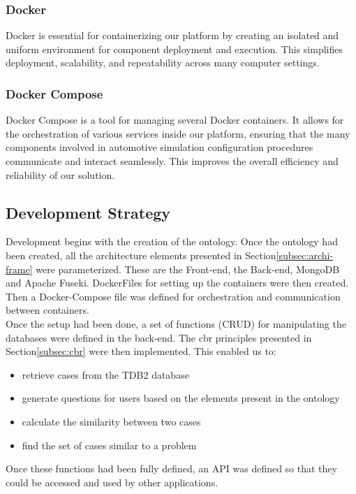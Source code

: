     \subsubsection{Docker}
    Docker is essential for containerizing our platform by creating an isolated and uniform environment for component deployment and execution. This simplifies deployment, scalability, and repeatability across many computer settings.
    
    \subsubsection{Docker Compose}
    Docker Compose is a tool for managing several Docker containers. It allows for the orchestration of various services inside our platform, ensuring that the many components involved in automotive simulation configuration procedures communicate and interact seamlessly. This improves the overall efficiency and reliability of our solution.

    
\subsection{Development Strategy}
Development begins with the creation of the ontology. Once the ontology had been created, all the architecture elements presented in Section\ref{subsec:archi-frame} were parameterized. These are the Front-end, the Back-end, MongoDB and Apache Fuseki. DockerFiles for setting up the containers were then created. Then a Docker-Compose file was defined for orchestration and communication between containers.\\

Once the setup had been done, a set of functions (CRUD) for manipulating the databases were defined in the back-end. The \acrshort{cbr} principles presented in Section\ref{subsec:cbr} were then implemented. This enabled us to:
\begin{itemize}
    \item retrieve cases from the TDB2 database
    \item generate questions for users based on the elements present in the ontology
    \item calculate the similarity between two cases
    \item find the set of cases similar to a problem
\end{itemize}

Once these functions had been fully defined, an API was defined so that they could be accessed and used by other applications.

